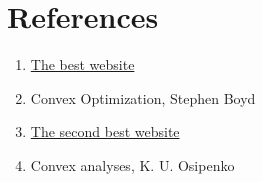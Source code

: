 \section{References}

\begin{enumerate}
    \item \href{https://fmin.xyz/}{The best website}
    \item Convex Optimization, Stephen Boyd
    \item \href{http://www.machinelearning.ru/wiki/index.php?title=%D0%9C%D0%B5%D1%82%D0%BE%D0%B4%D1%8B_%D0%BE%D0%BF%D1%82%D0%B8%D0%BC%D0%B8%D0%B7%D0%B0%D1%86%D0%B8%D0%B8_%D0%B2_%D0%BC%D0%B0%D1%88%D0%B8%D0%BD%D0%BD%D0%BE%D0%BC_%D0%BE%D0%B1%D1%83%D1%87%D0%B5%D0%BD%D0%B8%D0%B8_%28%D0%BA%D1%83%D1%80%D1%81_%D0%BB%D0%B5%D0%BA%D1%86%D0%B8%D0%B9%29/2017}{The second best website}
    \item Convex analyses, K. U. Osipenko
\end{enumerate}